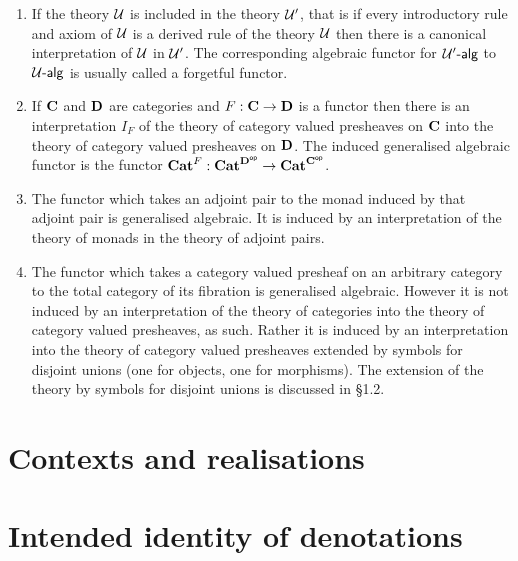   \begin{examples}

    \begin{enumerate}
      \item If the theory $\mathcal{U}$ is included in the theory $\mathcal{U}'$, that is if every introductory rule and axiom of $\mathcal{U}$ is a derived rule of the theory $\mathcal{U}$ then there is a canonical interpretation of $\mathcal{U}$ in $\mathcal{U}'$.
        The corresponding algebraic functor for $\mathcal{U}'\text{-}\mathsf{alg}$ to $\mathcal{U}\text{-}\mathsf{alg}$ is usually called a forgetful functor.

      \item If $\mathbf{C}$ and $\mathbf{D}$ are categories and $F:\mathbf{C}\to\mathbf{D}$ is a functor then there is an interpretation $I_F$ of the theory of category valued presheaves on $\mathbf{C}$ into the theory of category valued presheaves on $\mathbf{D}$. The induced generalised algebraic functor is the functor $\mathbf{Cat}^F:\mathbf{Cat}^{\mathbf{D}^{\mathsf{op}}}\to\mathbf{Cat}^{\mathbf{C}^{\mathsf{op}}}$.

      \item The functor which takes an adjoint pair to the monad induced by that adjoint pair is generalised algebraic.
        It is induced by an interpretation of the theory of monads in the theory of adjoint pairs.

      \item The functor which takes a category valued presheaf on an arbitrary category to the total category of its fibration is generalised algebraic.
        However it is not induced by an interpretation of the theory of categories into the theory of category valued presheaves, as such.
        Rather it is induced by an interpretation into the theory of category valued presheaves extended by symbols for disjoint unions (one for objects, one for morphisms).
        The extension of the theory by symbols for disjoint unions is discussed in \S 1.2.
    \end{enumerate}
  \end{examples}

  \section{Contexts and realisations} \label{sec:source-1-12}

  \lipsum[11]

  \section{Intended identity of denotations} \label{sec:source-1-13}

